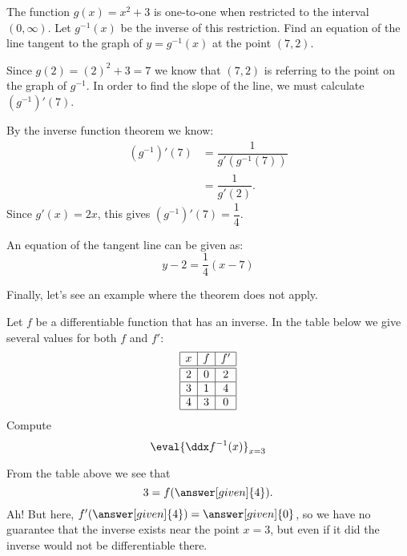 \documentclass{ximera}
\begin{document}
\begin{example}
	The function $g(x) = x^2 + 3$ is one-to-one when restricted to the interval $(0, \infty)$. Let $g^{-1}(x)$ be the 
	inverse of this restriction. Find an equation of the line tangent to the graph of $y=g^{-1}(x)$ at the point $(7, 2)$.
	\begin{explanation}
		Since $g(2) = (2)^2 + 3 = 7$ we know that $(7, 2)$ is referring to the point on the graph of $g^{-1}$. In order to
		find the slope of the line, we must calculate $\left( g^{-1}\right)'(7)$.
		
		By the inverse function theorem we know:
		\begin{align*}
			\left( g^{-1}\right)'(7) &= \dfrac{1}{g'\left( g^{-1}(7) \right)}\\
				&= \dfrac{1}{g'\left( 2 \right)}.
		\end{align*}
		Since $g'(x) = 2x$, this gives $\left( g^{-1}\right)'(7) = \dfrac{1}{4}$.
		
		An equation of the tangent line can be given as:
		\[ y-2 = \dfrac{1}{4}(x-7) \]
	\end{explanation}
\end{example}









Finally, let's see an example where the theorem does not apply.

\begin{example}
  Let $f$ be a differentiable function that has an inverse. In the
  table below we give several values for both $f$ and $f'$:
  \[
  \begin{array}{|c|c|c|}\hline
    x & f  & f' \\ \hline \hline
    2 & 0  & 2  \\ \hline
    3 & 1  & 4 \\ \hline
    4 & 3 & 0  \\ \hline
  \end{array}
  \]
  Compute
  \[
  \eval{\ddx f^{-1}(x)}_{x=3}
  \]
  \begin{explanation}
    From the table above we see that
    \[
    3 = f(\answer[given]{4}).
    \]
    Ah! But here, $f'(\answer[given]{4}) = \answer[given]{0}$, so we have no guarantee that the
    inverse exists near the point $x=3$, but even if it did the inverse would not be differentiable there.
      \end{explanation}
\end{example}
\end{document}
